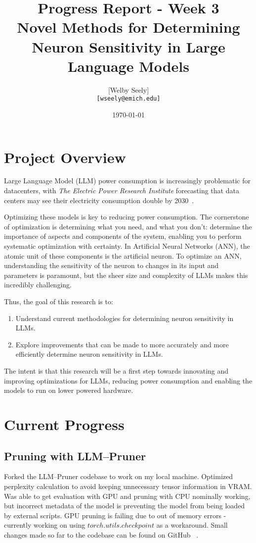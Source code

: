 \documentclass{article}
\title{Progress Report - Week 3 \\
\large Novel Methods for Determining Neuron Sensitivity in Large Language Models}
\author{
    [Welby Seely] \\
    \texttt{[wseely@emich.edu]}
}
\date{\today}
\begin{document}
    \maketitle


    \section{Project Overview}\label{sec:project-overview}
    Large Language Model (LLM) power consumption is increasingly problematic for datacenters, with \textit{The Electric Power
    Research Institute} forecasting that data centers may see their electricity consumption double by
    2030~\cite{kindig2024}.

    Optimizing these models is key to reducing power consumption.
    The cornerstone of optimization is determining what you need, and what you don't: determine the importance of
    aspects and components of the system, enabling you to perform systematic optimization with certainty.
    In Artificial Neural Networks (ANN), the atomic unit of these components is the artificial neuron.
    To optimize an ANN, understanding the sensitivity of the neuron to changes in its input and parameters is paramount,
    but the sheer size and complexity of LLMs makes this incredibly challenging.

    Thus, the goal of this research is to:
    \begin{enumerate}
        \item Understand current methodologies for determining neuron sensitivity in LLMs.
        \item Explore improvements that can be made to more accurately and more efficiently determine neuron sensitivity in
        LLMs.
    \end{enumerate}

    The intent is that this research will be a first step towards innovating and improving optimizations for LLMs,
    reducing power consumption and enabling the models to run on lower powered hardware.


    \section{Current Progress}\label{sec:current-progress}

    \subsection{Pruning with LLM--Pruner}\label{subsec:pruning-with-llm--pruner}
    Forked the LLM--Pruner codebase to work on my local machine.
    Optimized perplexity calculation to avoid keeping unnecessary tensor information in VRAM. Was able to get evaluation with GPU and pruning with CPU nominally working, but incorrect metadata of the model is preventing the model from being loaded by external scripts.
    GPU pruning is failing due to out of memory errors - currently working on using $torch.utils.checkpoint$ as a workaround.
    Small changes made so far to the codebase can be found on GitHub ~\cite{llm-pruner-pr}.
\end{document}
